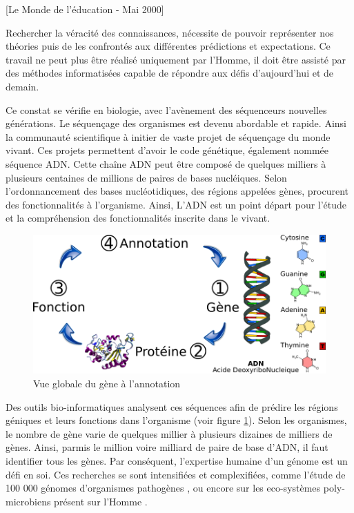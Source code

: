 \begin{refsection}
[Le Monde de l'éducation - Mai 2000]

Rechercher la véracité des connaissances, nécessite de pouvoir représenter nos théories puis de les confrontés aux différentes prédictions et expectations. Ce travail ne peut plus être réalisé uniquement par l'Homme, il doit être assisté par des méthodes informatisées capable de répondre aux défis d'aujourd'hui et de demain.

Ce constat se vérifie en biologie, avec l'avènement des séquenceurs nouvelles générations. Le séquençage des organismes est devenu abordable et rapide. Ainsi la communauté scientifique à initier de vaste projet de séquençage du monde vivant. Ces projets permettent d'avoir le code génétique, également nommée séquence \gls{ADN}. Cette chaîne ADN peut être composé de quelques milliers à plusieurs centaines de millions de paires de bases nucléiques. Selon l'ordonnancement des bases nucléotidiques, des régions appelées gènes, procurent des fonctionnalités à l'organisme. Ainsi, L'ADN est un point départ pour l'étude et la compréhension des fonctionnalités inscrite dans le vivant.

\begin{figure}[!h]
    \centering
    \includegraphics{img/simple_annotation_process_numéroté.png}
    \caption{Vue globale du gène à l'annotation }
    \label{fig:glob_annotation}
\end{figure}

Des outils bio-informatiques analysent ces séquences afin de prédire les régions géniques et leurs fonctions dans l'organisme (voir figure \ref{fig:glob_annotation}). Selon les organismes, le nombre de gène varie de quelques millier à plusieurs dizaines de milliers de gènes. Ainsi, parmis le million voire milliard de paire de base d'ADN, il faut identifier tous les gènes. Par conséquent, l'expertise humaine d'un génome est un défi en soi. Ces recherches se sont intensifiées et complexifiées, comme l'étude de 100 000 génomes d'organismes pathogènes \cite{100kfoodborne}, ou encore sur les eco-systèmes poly-microbiens présent sur l'Homme \cite{hmp}.


\end{refsection}
